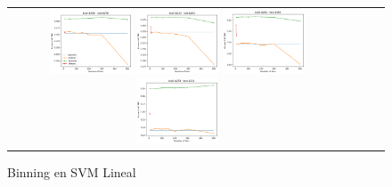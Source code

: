 \begin{figure}[h!]
\begin{tabular}{cccc}
  \includegraphics[width=0.25\textwidth]{Kap4/Figure_9.png}  \includegraphics[width=0.25\textwidth]{Kap4/Figure_10.png}
  \includegraphics[width=0.25\textwidth]{Kap4/Figure_11.png} \includegraphics[width=0.25\textwidth]{Kap4/Figure_12.png} 
\end{tabular}
\caption{Binning en SVM Lineal}
\label{fig:svml_binning}
\end{figure}

